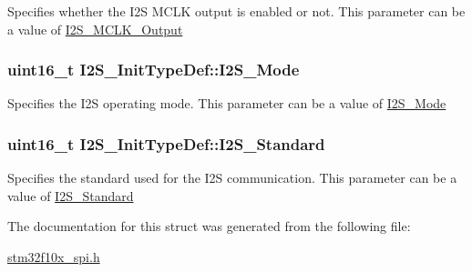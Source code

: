 \label{structI2S__InitTypeDef_ae7aaf79b7f392d79ac2f7b35a24e5d1a}
Specifies whether the I2S MCLK output is enabled or not. This parameter can be a value of \hyperlink{group__I2S__MCLK__Output}{I2S\_\-MCLK\_\-Output} \hypertarget{structI2S__InitTypeDef_aa57e5190eac245c0873a00849b1bd239}{
\subsubsection[{I2S\_\-Mode}]{\setlength{\rightskip}{0pt plus 5cm}uint16\_\-t {\bf I2S\_\-InitTypeDef::I2S\_\-Mode}}}
\label{structI2S__InitTypeDef_aa57e5190eac245c0873a00849b1bd239}
Specifies the I2S operating mode. This parameter can be a value of \hyperlink{group__I2S__Mode}{I2S\_\-Mode} \hypertarget{structI2S__InitTypeDef_ae987936e7cb9a962ee388c98f8c872b7}{
\subsubsection[{I2S\_\-Standard}]{\setlength{\rightskip}{0pt plus 5cm}uint16\_\-t {\bf I2S\_\-InitTypeDef::I2S\_\-Standard}}}
\label{structI2S__InitTypeDef_ae987936e7cb9a962ee388c98f8c872b7}
Specifies the standard used for the I2S communication. This parameter can be a value of \hyperlink{group__I2S__Standard}{I2S\_\-Standard} 

The documentation for this struct was generated from the following file:\begin{DoxyCompactItemize}
\item 
\hyperlink{stm32f10x__spi_8h}{stm32f10x\_\-spi.h}\end{DoxyCompactItemize}
